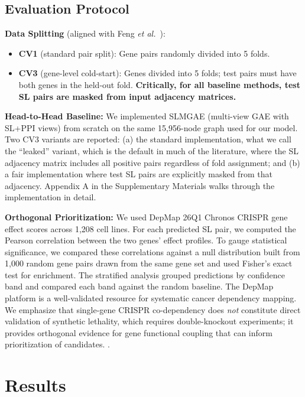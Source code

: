 \documentclass[12pt,a4paper]{article}
\begin{document}
\subsection{Evaluation Protocol}

\textbf{Data Splitting} (aligned with Feng \textit{et al.}~\cite{feng2024}):
\begin{itemize}[nosep]
    \item \textbf{CV1} (standard pair split): Gene pairs randomly divided into 5 folds.
    \item \textbf{CV3} (gene-level cold-start): Genes divided into 5 folds; test pairs must have both genes in the held-out fold. \textbf{Critically, for all baseline methods, test SL pairs are masked from input adjacency matrices.}
\end{itemize}

\textbf{Head-to-Head Baseline:} We implemented SLMGAE (multi-view GAE with SL+PPI views) from scratch on the same 15,956-node graph used for our model. Two CV3 variants are reported: (a) the standard implementation, what we call the ``leaked'' variant, which is the default in much of the literature, where the SL adjacency matrix includes all positive pairs regardless of fold assignment; and (b) a fair implementation where test SL pairs are explicitly masked from that adjacency. Appendix A in the Supplementary Materials walks through the implementation in detail.

\textbf{Orthogonal Prioritization:} We used DepMap 26Q1 Chronos CRISPR gene effect scores across 1,208 cell lines. For each predicted SL pair, we computed the Pearson correlation between the two genes' effect profiles. To gauge statistical significance, we compared these correlations against a null distribution built from 1,000 random gene pairs drawn from the same gene set and used Fisher's exact test for enrichment. The stratified analysis grouped predictions by confidence band and compared each band against the random baseline. The DepMap platform is a well-validated resource for systematic cancer dependency mapping. We emphasize that single-gene CRISPR co-dependency does \textit{not} constitute direct validation of synthetic lethality, which requires double-knockout experiments; it provides orthogonal evidence for gene functional coupling that can inform prioritization of candidates. \cite{arafeh2024}.

\section{Results}
\end{document}
